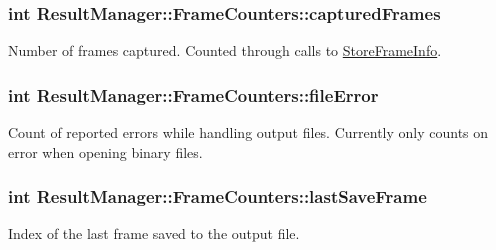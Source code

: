 \subsubsection[{\texorpdfstring{captured\+Frames}{capturedFrames}}]{\setlength{\rightskip}{0pt plus 5cm}int Result\+Manager\+::\+Frame\+Counters\+::captured\+Frames}\hypertarget{struct_result_manager_1_1_frame_counters_ae9b12ed92f9c0a9e72a51beaf9cca61f}{}\label{struct_result_manager_1_1_frame_counters_ae9b12ed92f9c0a9e72a51beaf9cca61f}


Number of frames captured. Counted through calls to \hyperlink{class_result_manager_a0bbedc935395c1af29f175f81ab063c9}{Store\+Frame\+Info}. 

\subsubsection[{\texorpdfstring{file\+Error}{fileError}}]{\setlength{\rightskip}{0pt plus 5cm}int Result\+Manager\+::\+Frame\+Counters\+::file\+Error}\hypertarget{struct_result_manager_1_1_frame_counters_a524c00c33ddf14ff4f3e467f4daaf7f8}{}\label{struct_result_manager_1_1_frame_counters_a524c00c33ddf14ff4f3e467f4daaf7f8}


Count of reported errors while handling output files. Currently only counts on error when opening binary files. 

\subsubsection[{\texorpdfstring{last\+Save\+Frame}{lastSaveFrame}}]{\setlength{\rightskip}{0pt plus 5cm}int Result\+Manager\+::\+Frame\+Counters\+::last\+Save\+Frame}\hypertarget{struct_result_manager_1_1_frame_counters_a529d0916bd3925ce9b60de516875ae2e}{}\label{struct_result_manager_1_1_frame_counters_a529d0916bd3925ce9b60de516875ae2e}


Index of the last frame saved to the output file. 

